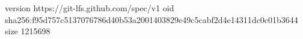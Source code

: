 version https://git-lfs.github.com/spec/v1
oid sha256:f95d757c5137076786d40b53a2001403829e49c5cabf2d4e14311dc0c01b3644
size 1215698
